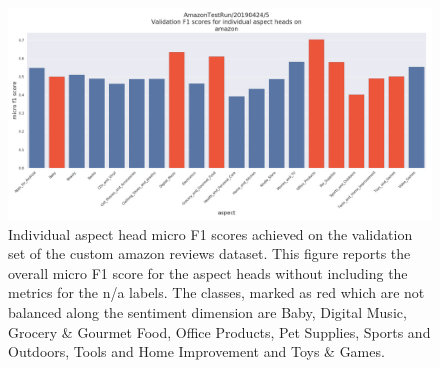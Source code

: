 \begin{figure}[H]
	\centering
	\includegraphics[width=\textwidth]{figures/08_appendix/08_am_headResults}
	\caption{Individual aspect head micro F1 scores achieved on the validation set of the custom amazon reviews dataset. This figure reports the overall micro F1 score for the aspect heads without including the metrics for the n/a labels. The classes, marked as red which are not balanced along the sentiment dimension are Baby, Digital Music, Grocery \& Gourmet Food, Office Products, Pet Supplies, Sports and Outdoors, Tools and Home Improvement and Toys \& Games.}
	\label{fig:08_am_val_f1}
\end{figure}